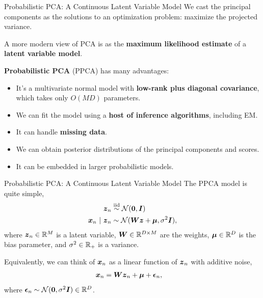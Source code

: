 \documentclass[aspectratio=169]{beamer}
\begin{document}
\begin{frame}[t]{Probabilistic PCA: A Continuous Latent Variable Model}
    We cast the principal components as the solutions to an optimization problem: maximize the projected variance.
    
    A more modern view of PCA is as the \textbf{maximum likelihood estimate} of a \textbf{latent variable model}.
    
    \textbf{Probabilistic PCA} (PPCA) has many advantages:
    \begin{itemize}
        \item It's a multivariate normal model with \textbf{low-rank plus diagonal covariance}, which takes only $O(MD)$ parameters.
        \item We can fit the model using a \textbf{host of inference algorithms}, including EM.
        \item It can handle \textbf{missing data}.
        \item We can obtain posterior distributions of the principal components and scores. 
        \item It can be embedded in larger probabilistic models.
    \end{itemize}
\end{frame}

\begin{frame}[t]{Probabilistic PCA: A Continuous Latent Variable Model}
    The PPCA model is quite simple,
    \begin{align}
        \boldsymbol{z}_n &\stackrel{\text{iid}}{\sim} \mathcal{N}(\boldsymbol{0}, \boldsymbol{I}) \\
        \boldsymbol{x}_n ~\vert~ \boldsymbol{z}_n &\sim \mathcal{N}(\boldsymbol{W} \boldsymbol{z} + \boldsymbol{\mu}, \sigma^2 \boldsymbol{I}),
    \end{align}
    where $\boldsymbol{z}_n \in \mathbb{R}^M$ is a latent variable, $\boldsymbol{W} \in \mathbb{R}^{D \times M}$ are the weights, $\boldsymbol{\mu} \in \mathbb{R}^D$ is the bias parameter, and $\sigma^2 \in \mathbb{R}_+$ is a variance. 
    
    Equivalently, we can think of $\boldsymbol{x}_n$ as a linear function of $\boldsymbol{z}_n$ with additive noise,
    \begin{align}
        \boldsymbol{x}_n &= \boldsymbol{W} \boldsymbol{z}_n + \boldsymbol{\mu} + \boldsymbol{\epsilon}_n,
    \end{align}
    where $\boldsymbol{\epsilon}_n \sim \mathcal{N}(\boldsymbol{0}, \sigma^2 \boldsymbol{I}) \in \mathbb{R}^D$.
\end{frame}
\end{document}
